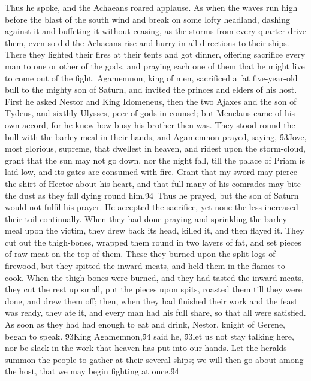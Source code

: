 {Thus he spoke, and the Achaeans roared applause. As when the waves run high before the blast of the south wind and break on some lofty headland, dashing against it and buffeting it without ceasing, as the storms from every quarter drive them, even so did the Achaeans rise and hurry in all directions to their ships. There they lighted their fires at their tents and got dinner, offering sacrifice every man to one or other of the gods, and praying each one of them that he might live to come out of the fight. Agamemnon, king of men, sacrificed a fat five-year-old bull to the mighty son of Saturn, and invited the princes and elders of his host. First he asked Nestor and King Idomeneus, then the two Ajaxes and the son of Tydeus, and sixthly Ulysses, peer of gods in counsel; but Menelaus came of his own accord, for he knew how busy his brother then was. They stood round the bull with the barley-meal in their hands, and Agamemnon prayed, saying, \'93Jove, most glorious, supreme, that dwellest in heaven, and ridest upon the storm-cloud, grant that the sun may not go down, nor the night fall, till the palace of Priam is laid low, and its gates are consumed with fire. Grant that my sword may pierce the shirt of Hector about his heart, and that full many of his comrades may bite the dust as they fall dying round him.\'94\
Thus he prayed, but the son of Saturn would not fulfil his prayer. He accepted the sacrifice, yet none the less increased their toil continually. When they had done praying and sprinkling the barley-meal upon the victim, they drew back its head, killed it, and then flayed it. They cut out the thigh-bones, wrapped them round in two layers of fat, and set pieces of raw meat on the top of them. These they burned upon the split logs of firewood, but they spitted the inward meats, and held them in the flames to cook. When the thigh-bones were burned, and they had tasted the inward meats, they cut the rest up small, put the pieces upon spits, roasted them till they were done, and drew them off; then, when they had finished their work and the feast was ready, they ate it, and every man had his full share, so that all were satisfied. As soon as they had had enough to eat and drink, Nestor, knight of Gerene, began to speak. \'93King Agamemnon,\'94 said he, \'93let us not stay talking here, nor be slack in the work that heaven has put into our hands. Let the heralds summon the people to gather at their several ships; we will then go about among the host, that we may begin fighting at once.\'94\
}
